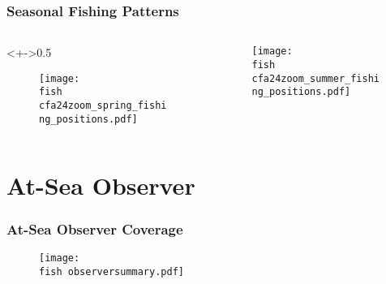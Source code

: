 \documentclass{beamer}
\begin{document}
	\begin{frame}
		\frametitle{Seasonal Fishing Patterns}
		
		\begin{columns}
			\begin{column}<+->{0.5\textwidth}
				\vspace*{-0.5cm}
				\begin{figure}
					\centerline{\texttt{[image: \\fish cfa24zoom\_spring\_fishing\_positions.pdf]}}
					
				\end{figure}
			\end{column}
			
			\begin{column}{0.5\textwidth}
				\begin{figure}
					\vspace*{-0.5cm}
					
					\centerline{\texttt{[image: \\fish cfa24zoom\_summer\_fishing\_positions.pdf]}}
					
				\end{figure}
				
			\end{column}
		\end{columns}
		
	\end{frame}
	
	
	
	\section{At-Sea Observer}
	
	
	
	\begin{frame}
		\frametitle{At-Sea Observer Coverage}
		\begin{figure}
			
			\vspace*{-.5cm}
			\centerline{\texttt{[image: \\fish observersummary.pdf]}}
			
		\end{figure}
	\end{frame}
	
	
	
\end{document}
